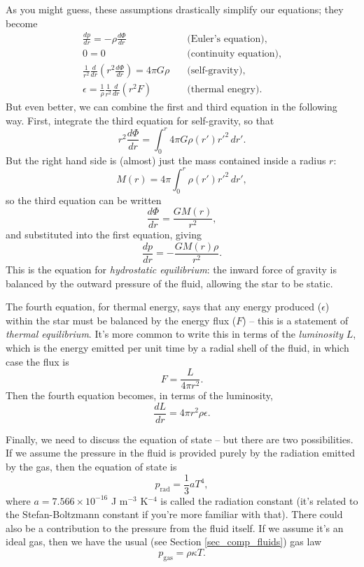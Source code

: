 As you might guess, these assumptions drastically simplify our equations; they become
\begin{align}
\frac{dp}{dr} = -\rho \frac{d\Phi}{dr}  & \quad \text{(Euler's equation),} \label{eq_star_1} \\
0 = 0 & \quad \text{(continuity equation),} \\
\frac{1}{r^2} \frac{d}{dr} \left(r^2 \frac{d\Phi}{dr} \right) = 4 \pi G \rho & \quad \text{(self-gravity),} \label{eq_star_3} \\
\epsilon = \frac{1}{\rho} \frac{1}{r^2} \frac{d}{dr} ( r^2 F) & \quad \text{(thermal enegry).} \label{eq_star_4}
\end{align}
But even better, we can combine the first and third equation in the following way.  First, integrate the third equation for self-gravity, so that
\[
r^2 \frac{d\Phi}{dr} = \int_0^r 4\pi G \rho(r') r'^2 \, dr'.
\]
But the right hand side is (almost) just the mass contained inside a radius $r$:
\[
M(r) = 4\pi \int_0^r \rho(r') r'^2 \, dr',
\]
so the third equation can be written
\begin{equation}
\frac{d\Phi}{dr} = \frac{GM(r)}{r^2},
\end{equation}
and substituted into the first equation, giving
\begin{equation}
\label{eq_star_1b}
\boxed{
\frac{dp}{dr} = - \frac{GM(r) \rho}{r^2}.
}
\end{equation}
This is the equation for \emph{hydrostatic equilibrium}: the inward force of gravity is balanced by the outward pressure of the fluid, allowing the star to be static.

The fourth equation, for thermal energy, says that any energy produced ($\epsilon$) within the star must be balanced by the energy flux ($F$) -- this is a statement of \emph{thermal equilibrium}.  It's more common to write this in terms of the \emph{luminosity} $L$, which is the energy emitted per unit time by a radial shell of the fluid, in which case the flux is
\begin{equation}
F = \frac{L}{4\pi r^2}.
\end{equation}
Then the fourth equation becomes, in terms of the luminosity,
\begin{equation}
\boxed{
\frac{dL}{dr} = 4\pi r^2 \rho \epsilon.
}
\end{equation}

Finally, we need to discuss the equation of state -- but there are two possibilities.  If we assume the pressure in the fluid is provided purely by the radiation emitted by the gas, then the equation of state is
\begin{equation}
p_\text{rad} = \frac{1}{3} aT^4,
\end{equation}
where $a = 7.566 \times 10^{-16}$ J m$^{-3}$ K$^{-4}$ is called the radiation constant (it's related to the Stefan-Boltzmann constant if you're more familiar with that).  There could also be a contribution to the pressure from the fluid itself.  If we assume it's an ideal gas, then we have the usual (see Section \ref{sec_comp_fluids}) gas law
\begin{equation}
p_\text{gas} = \rho \kappa T.
\end{equation}

